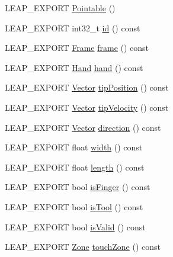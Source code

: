 \begin{DoxyCompactItemize}
\item 
L\+E\+A\+P\+\_\+\+E\+X\+P\+O\+R\+T \hyperlink{class_leap_1_1_pointable_a5b42d880b673daa25c938d9fcf8d93eb}{Pointable} ()
\item 
L\+E\+A\+P\+\_\+\+E\+X\+P\+O\+R\+T int32\+\_\+t \hyperlink{class_leap_1_1_pointable_ae9f83eb705c71bb7b424f886942b542b}{id} () const 
\item 
L\+E\+A\+P\+\_\+\+E\+X\+P\+O\+R\+T \hyperlink{class_leap_1_1_frame}{Frame} \hyperlink{class_leap_1_1_pointable_ad9e1c4df8ce62d591ca52e432cf4848f}{frame} () const 
\item 
L\+E\+A\+P\+\_\+\+E\+X\+P\+O\+R\+T \hyperlink{class_leap_1_1_hand}{Hand} \hyperlink{class_leap_1_1_pointable_a7858c2e5b5bf614ba3991e5237feed9a}{hand} () const 
\item 
L\+E\+A\+P\+\_\+\+E\+X\+P\+O\+R\+T \hyperlink{struct_leap_1_1_vector}{Vector} \hyperlink{class_leap_1_1_pointable_aaa7d42165f9511f18a20d3b7441a7eb5}{tip\+Position} () const 
\item 
L\+E\+A\+P\+\_\+\+E\+X\+P\+O\+R\+T \hyperlink{struct_leap_1_1_vector}{Vector} \hyperlink{class_leap_1_1_pointable_abf52ec088026b9d1a7f46ff445c130e3}{tip\+Velocity} () const 
\item 
L\+E\+A\+P\+\_\+\+E\+X\+P\+O\+R\+T \hyperlink{struct_leap_1_1_vector}{Vector} \hyperlink{class_leap_1_1_pointable_adf395a6689ebf00a17dd6d33a4aeaccd}{direction} () const 
\item 
L\+E\+A\+P\+\_\+\+E\+X\+P\+O\+R\+T float \hyperlink{class_leap_1_1_pointable_a1287f947168fcd1856098f7628509602}{width} () const 
\item 
L\+E\+A\+P\+\_\+\+E\+X\+P\+O\+R\+T float \hyperlink{class_leap_1_1_pointable_ab28e9e4be4d507b6093b6aa015cac816}{length} () const 
\item 
L\+E\+A\+P\+\_\+\+E\+X\+P\+O\+R\+T bool \hyperlink{class_leap_1_1_pointable_acb22151412f46b6be8b773986452eba8}{is\+Finger} () const 
\item 
L\+E\+A\+P\+\_\+\+E\+X\+P\+O\+R\+T bool \hyperlink{class_leap_1_1_pointable_ac10f09626b790dd5867411748242c437}{is\+Tool} () const 
\item 
L\+E\+A\+P\+\_\+\+E\+X\+P\+O\+R\+T bool \hyperlink{class_leap_1_1_pointable_a124f21a619df4fb338d1ce8a7a6d3341}{is\+Valid} () const 
\item 
L\+E\+A\+P\+\_\+\+E\+X\+P\+O\+R\+T \hyperlink{class_leap_1_1_pointable_ad6e50b9878b8c1fdf899b5e09721deef}{Zone} \hyperlink{class_leap_1_1_pointable_a6cc17d698df38fe84bbf507a8def65ac}{touch\+Zone} () const 
\item 

\end{DoxyCompactItemize}
